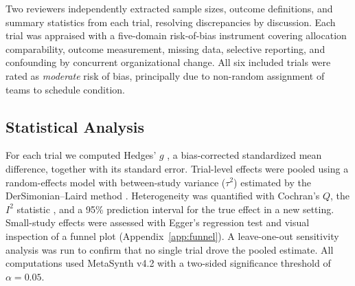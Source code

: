 Two reviewers independently extracted sample sizes, outcome definitions, and summary
statistics from each trial, resolving discrepancies by discussion. Each trial was appraised
with a five-domain risk-of-bias instrument covering allocation comparability, outcome
measurement, missing data, selective reporting, and confounding by concurrent
organizational change. All six included trials were rated as \emph{moderate} risk of bias,
principally due to non-random assignment of teams to schedule condition.

\subsection{Statistical Analysis}

For each trial we computed Hedges' $g$ \citep{hedges1981distribution}, a bias-corrected
standardized mean difference, together with its standard error. Trial-level effects were
pooled using a random-effects model with between-study variance ($\tau^2$) estimated by the
DerSimonian--Laird method \citep{dersimonian1986random}. Heterogeneity was quantified with
Cochran's $Q$, the $I^2$ statistic \citep{higgins2003measuring}, and a 95\% prediction
interval for the true effect in a new setting. Small-study effects were assessed with
Egger's regression test \citep{egger1997bias} and visual inspection of a funnel plot
(Appendix~\ref{app:funnel}). A leave-one-out sensitivity analysis was run to confirm that no
single trial drove the pooled estimate. All computations used MetaSynth v4.2 with a
two-sided significance threshold of $\alpha = 0.05$.
